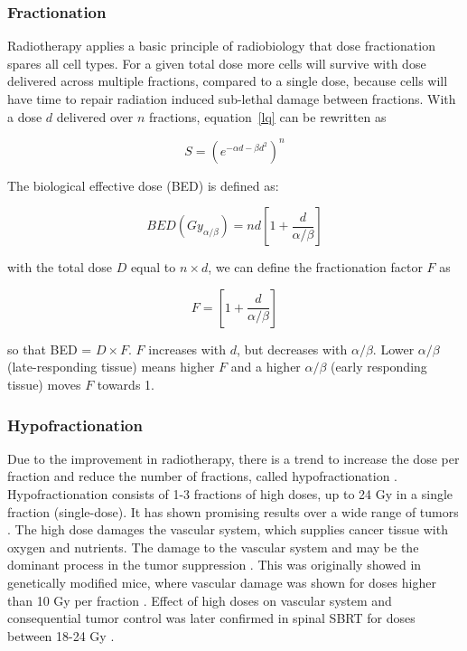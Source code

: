\subsubsection{Fractionation}

Radiotherapy applies a basic principle of radiobiology that dose fractionation spares all cell types. For a given total dose
more cells will survive with dose delivered across multiple fractions, compared to a single dose, because cells will have time to repair
radiation induced sub-lethal damage between fractions.
With a dose $d$ delivered over $n$ fractions, equation~\ref{lq} can be rewritten as \cite{Shrieve2011}

\begin{equation}
 S = (e^{-\alpha d - \beta d^2})^n
\end{equation}

The biological effective dose (BED) is defined as:

\begin{equation}
 BED(Gy_{\alpha/\beta})=nd\left[1 + \frac{d}{\alpha/\beta} \right]
\end{equation}

with the total dose $D$ equal to $n \times d$, we can define the fractionation factor $F$ as

\begin{equation}
 F = \left[1 + \frac{d}{\alpha / \beta} \right]
\end{equation}

so that BED = $D \times F$. $F$ increases with $d$, but decreases with $\alpha / \beta$. Lower $\alpha / \beta$ (late-responding tissue)
means higher $F$ and a higher $\alpha / \beta$ (early responding tissue) moves $F$ towards 1.


\subsubsection{Hypofractionation}

Due to the improvement in radiotherapy, there is a trend to increase the dose per fraction and reduce the number of fractions, called hypofractionation \cite{Lo2010}.
Hypofractionation consists of 1-3 fractions of high doses, up to 24 Gy in a single fraction (single-dose). It has shown promising results over a wide range of tumors \cite{Yamada2008, Greco2011, Halasz2013}.
The high dose damages the vascular system, which supplies cancer tissue with oxygen and nutrients. The damage to the vascular system and may be the dominant process in the tumor suppression \cite{Fuks2005}.
This was originally showed in genetically modified mice, where vascular damage
was shown for doses higher than 10 Gy per fraction \cite{Garcia2003}. Effect of high doses on vascular system and consequential tumor control was later confirmed in spinal SBRT for doses between 18-24 Gy \cite{Yamada2008}.

